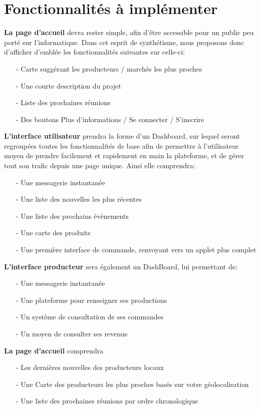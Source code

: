 \chapter*{Fonctionnalités à implémenter}
\textbf{La page d'accueil} devra rester simple, afin d’être accessible pour un public peu porté sur l’informatique. Dans cet esprit de synthétisme, nous proposons donc d’afficher d’emblée les fonctionnalités suivantes sur celle-ci:
\begin{itemize}
	\item[-] Carte suggérant les producteurs / marchés les plus proches
	\item[-] Une courte description du projet
	\item[-] Liste des prochaines réunions
	\item[-] Des boutons Plus d’informations / Se connecter / S’inscrire
\end{itemize}

\textbf{L’interface utilisateur} prendra la forme d’un Dashboard, sur lequel seront regroupées toutes les fonctionnalités de base afin de permettre à l’utilisateur moyen de prendre facilement et rapidement en main la plateforme, et de gérer tout son trafic depuis une page unique. Ainsi elle comprendra:
\begin{itemize}
	\item[-] Une messagerie instantanée
	\item[-] Une liste des nouvelles les plus récentes
	\item[-] Une liste des prochains évènements
	\item[-] Une carte des produits
	\item[-] Une première interface de commande, renvoyant vers un applet plus complet
\end{itemize}

\textbf{L’interface producteur} sera également un DashBoard, lui permettant de:
\begin{itemize}
	\item[-] Une messagerie instantanée
	\item[-] Une plateforme pour renseigner ses productions
	\item[-] Un système de consultation de ses commandes
	\item[-] Un moyen de consulter ses revenus
\end{itemize}

\textbf{La page d'accueil} comprendra
\begin{itemize}
	\item[-] Les dernières nouvelles des producteurs locaux
	\item[-] Une Carte des producteurs les plus proches basés sur votre géolocalisation
	\item[-] Une liste des prochaines réunions par ordre chronologique
\end{itemize}

